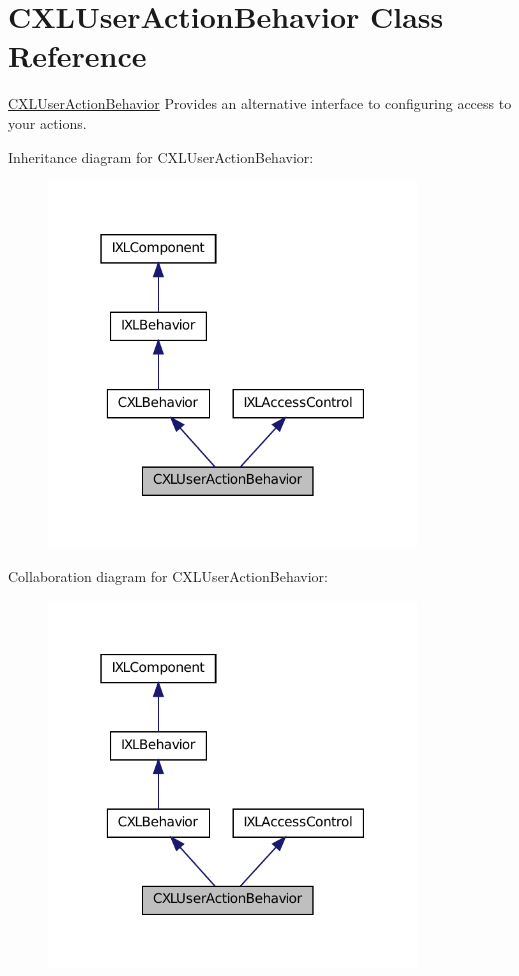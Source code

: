 \hypertarget{classCXLUserActionBehavior}{
\section{CXLUserActionBehavior Class Reference}
\label{classCXLUserActionBehavior}
}


\hyperlink{classCXLUserActionBehavior}{CXLUserActionBehavior} Provides an alternative interface to configuring access to your actions.  




Inheritance diagram for CXLUserActionBehavior:\nopagebreak
\begin{figure}[H]
\begin{center}
\leavevmode
\includegraphics[width=277pt]{classCXLUserActionBehavior__inherit__graph}
\end{center}
\end{figure}


Collaboration diagram for CXLUserActionBehavior:\nopagebreak
\begin{figure}[H]
\begin{center}
\leavevmode
\includegraphics[width=277pt]{classCXLUserActionBehavior__coll__graph}
\end{center}
\end{figure}
